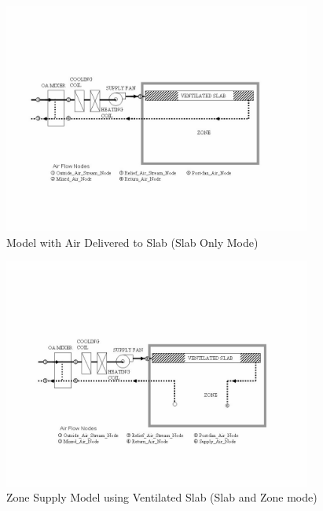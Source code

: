 \begin{figure}[hbtp] %
\centering
\includegraphics[width=0.9\textwidth, height=0.9\textheight, keepaspectratio=true]{media/image7397.png}
\caption{Model with Air Delivered to Slab (Slab Only Mode) \protect \label{fig:model-with-air-delivered-to-slab.-slab-only}}
\end{figure}

\begin{figure}[hbtp] %
\centering
\includegraphics[width=0.9\textwidth, height=0.9\textheight, keepaspectratio=true]{media/image7398.png}
\caption{Zone Supply Model using Ventilated Slab (Slab and Zone mode) \protect \label{fig:zone-supply-model-using-ventilated-slab-slab}}
\end{figure}

